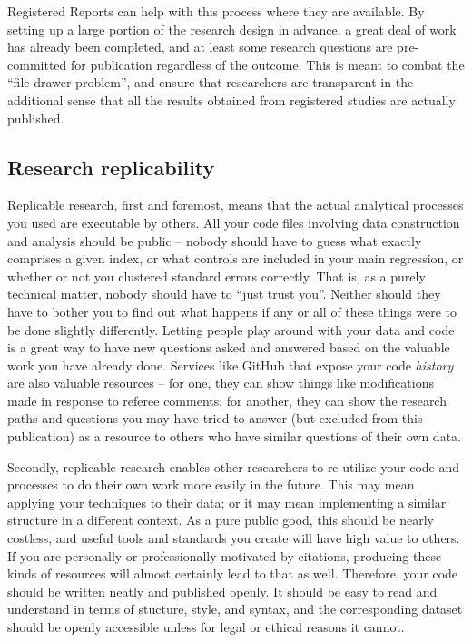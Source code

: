 Registered Reports can help with this process where they are available.
By setting up a large portion of the research design in advance,
a great deal of work has already been completed,
and at least some research questions are pre-committed for publication regardless of the outcome.
This is meant to combat the ``file-drawer problem'',\cite{simonsohn2014p}
and ensure that researchers are transparent in the additional sense that
all the results obtained from registered studies are actually published.

\subsection{Research replicability}

Replicable research, first and foremost, means that the actual analytical processes you used
are executable by others. All your code files involving data construction and analysis
should be public -- nobody should have to guess what exactly comprises a given index,
or what controls are included in your main regression,
or whether or not you clustered standard errors correctly.
That is, as a purely technical matter, nobody should have to ``just trust you''.
Neither should they have to bother you to find out what happens
if any or all of these things were to be done slightly differently.\cite{simmons2011false,wicherts2016degrees}
Letting people play around with your data and code is a great way to have new questions asked and answered
based on the valuable work you have already done.
Services like GitHub that expose your code \textit{history}
are also valuable resources -- for one, they can show things like modifications
made in response to referee comments; for another, they can show
the research paths and questions you may have tried to answer (but excluded from this publication)
as a resource to others who have similar questions of their own data.

Secondly, replicable research enables other researchers to re-utilize your code and processes
to do their own work more easily in the future.
This may mean applying your techniques to their data;
or it may mean implementing a similar structure in a different context.
As a pure public good, this should be nearly costless,
and useful tools and standards you create will have high value to others.
If you are personally or professionally motivated by citations,
producing these kinds of resources will almost certainly lead to that as well.
Therefore, your code should be written neatly and published openly.
It should be easy to read and understand in terms of stucture, style, and syntax,
and the corresponding dataset should be openly accessible unless for legal or ethical reasons it cannot.
